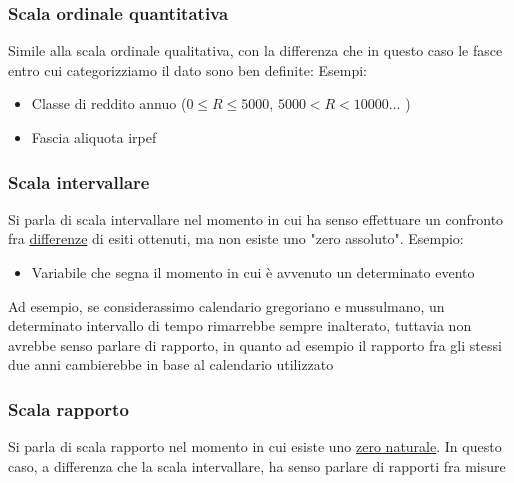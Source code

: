 \subsubsection*{Scala ordinale quantitativa}
Simile alla scala ordinale qualitativa, con la differenza che in questo caso le fasce entro cui categorizziamo il dato sono ben definite:
\vskip3mm
Esempi:
\begin{itemize}
	\item Classe di reddito annuo ($ 0 \le  R \le  5000 $, $ 5000 < R < 10000 \ldots $ )
	\item Fascia aliquota irpef
\end{itemize}
\subsubsection*{Scala intervallare}
Si parla di scala intervallare nel momento in cui ha senso effettuare un confronto fra \underline{differenze} di esiti ottenuti, ma non esiste uno "zero assoluto".
\vskip3mm
Esempio:
\begin{itemize}
	\item Variabile che segna il momento in cui è avvenuto un determinato evento
\end{itemize}
Ad esempio, se considerassimo calendario gregoriano e mussulmano, un determinato intervallo di tempo rimarrebbe sempre inalterato, tuttavia non avrebbe senso parlare di rapporto, in quanto ad esempio il rapporto fra gli stessi due anni cambierebbe in base al calendario utilizzato
\subsubsection*{Scala rapporto}
Si parla di scala rapporto nel momento in cui esiste uno \underline{zero naturale}. In questo caso, a differenza che la scala intervallare, ha senso parlare di rapporti fra misure

